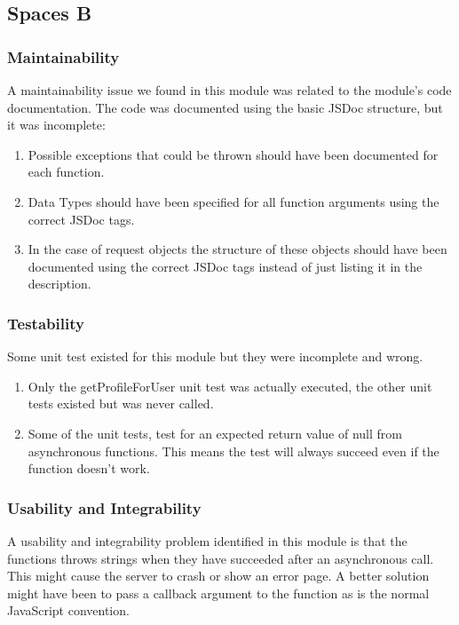\subsection{Spaces B}

\subsubsection{Maintainability}

A maintainability issue we found in this module was related to the module's code documentation. The code was documented using the basic JSDoc structure, but it was incomplete:
	\begin{enumerate}
		\item  Possible exceptions that could be thrown should have been documented for each function.
		\item Data Types should have been specified for all function arguments using the correct JSDoc tags.
		\item In the case of request objects the structure of these objects should have been documented using the correct JSDoc tags instead of just listing it in the description.
	\end{enumerate}

\subsubsection{Testability}
Some unit test existed for this module but they were incomplete and wrong.
\begin{enumerate}
\item Only the getProfileForUser unit test was actually executed, the other unit tests existed but was never called.
\item Some of the unit tests, test for an expected return value of null from asynchronous functions. This means the test will always succeed even if the function doesn't work.
\end{enumerate}

\subsubsection{Usability and Integrability}
A usability and integrability problem identified in this module is that the functions throws  strings when they have succeeded after an asynchronous call. This might cause the server to crash or show an error page. A better solution might have been to pass a callback argument to the function as is the normal JavaScript convention.


